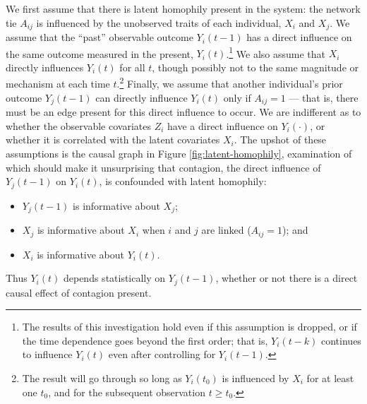 \documentclass{article}
\begin{document}
\begin{multicols}{2}
We first assume that there is latent homophily present in the system: the 
network tie $A_{ij}$ is influenced by the unobserved traits of each
individual, $X_i$ and $X_j$.  We assume that the ``past'' observable outcome
$Y_i(t-1)$ has a direct influence on the same outcome measured in the present,
$Y_i(t)$.\footnote{The results of this investigation hold even if this
  assumption is dropped, or if the time dependence goes beyond the first order;
  that is, $Y_i(t-k)$ continues to influence $Y_i(t)$ even after controlling
  for $Y_i(t-1)$.}  We also assume that $X_i$ directly influences $Y_i(t)$ for
all $t$, though possibly not to the same magnitude or mechanism at each time
$t$.\footnote{The result will go through so long as $Y_i(t_0)$ is influenced by
  $X_i$ for at least one $t_0$, and for the subsequent observation $t \geq
  t_0$.}  Finally, we assume that another individual's prior outcome $Y_j(t-1)$
can directly influence $Y_i(t)$ only if $A_{ij} = 1$ --- that is, there must be
an edge present for this direct influence to occur.  We are indifferent as to
whether the observable covariates $Z_i$ have a direct influence on
$Y_i(\cdot)$, or whether it is correlated with the latent covariates $X_i$.
The upshot of these assumptions is the causal graph in Figure
\ref{fig:latent-homophily}, examination of which should make it unsurprising
that contagion, the direct influence of $Y_j(t-1)$ on $Y_i(t)$, is confounded
with latent homophily:
\begin{itemize}
\item $Y_j(t-1)$ is informative about $X_j$; 
\item $X_j$ is informative about $X_i$ when $i$ and $j$ are linked ($A_{ij}=1$); and
\item $X_i$ is informative about $Y_i(t)$.  
\end{itemize}
Thus $Y_i(t)$ depends statistically on $Y_j(t-1)$, whether or not there is a
direct causal effect of contagion present.


\end{multicols}
\end{document}
